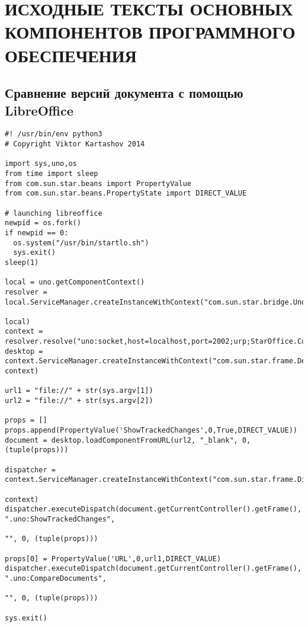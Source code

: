 \appendix
\chapter{ИСХОДНЫЕ ТЕКСТЫ ОСНОВНЫХ КОМПОНЕНТОВ ПРОГРАММНОГО ОБЕСПЕЧЕНИЯ} \label{AppendixA}

\section{Сравнение версий документа с помощью LibreOffice}\label{AppendixPython}
\begin{verbatim}
#! /usr/bin/env python3
# Copyright Viktor Kartashov 2014

import sys,uno,os
from time import sleep
from com.sun.star.beans import PropertyValue
from com.sun.star.beans.PropertyState import DIRECT_VALUE

# launching libreoffice
newpid = os.fork()
if newpid == 0:
  os.system("/usr/bin/startlo.sh")
  sys.exit()
sleep(1)

local = uno.getComponentContext()
resolver = local.ServiceManager.createInstanceWithContext("com.sun.star.bridge.UnoUrlResolver",
                                                                                          local)
context = resolver.resolve("uno:socket,host=localhost,port=2002;urp;StarOffice.ComponentContext")
desktop = context.ServiceManager.createInstanceWithContext("com.sun.star.frame.Desktop", context)

url1 = "file://" + str(sys.argv[1])
url2 = "file://" + str(sys.argv[2])

props = []
props.append(PropertyValue('ShowTrackedChanges',0,True,DIRECT_VALUE))
document = desktop.loadComponentFromURL(url2, "_blank", 0, (tuple(props)))

dispatcher = context.ServiceManager.createInstanceWithContext("com.sun.star.frame.DispatchHelper",
                                                                                          context)
dispatcher.executeDispatch(document.getCurrentController().getFrame(), ".uno:ShowTrackedChanges",
                                                                            "", 0, (tuple(props)))

props[0] = PropertyValue('URL',0,url1,DIRECT_VALUE)
dispatcher.executeDispatch(document.getCurrentController().getFrame(), ".uno:CompareDocuments",
                                                                            "", 0, (tuple(props)))

sys.exit()
\end{verbatim}

